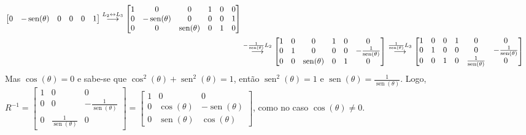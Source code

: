 \documentclass[12pt,a4paper]{article}
\newcommand*\sen{\operatorname{sen}}
\newcommand{\grstep}[2][\relax]{%
   \ensuremath{\mathrel{
       {\mathop{\longrightarrow}\limits^{#2\mathstrut}_{
                                     \begin{subarray}{l} #1 \end{subarray}}}}}}
\newcommand{\swap}{\leftrightarrow}
\begin{document}
\begin{enumerate}
\begin{align*}
\begin{bmatrix}
0 & -\sen(\theta) & 0 & 0 & 0 & 1
\end{bmatrix}
\grstep{ L_2 \swap L_3 }
\begin{bmatrix}
1 & 0 & 0 & 1 & 0 & 0 \\
0 & -\sen(\theta) & 0 & 0 & 0 & 1 \\
0 & 0 & \sen(\theta) & 0 & 1 & 0
\end{bmatrix}\\
&
\grstep{ -\frac{1}{\sen(\theta)} L_2 }
\begin{bmatrix}
1 & 0 & 0 & 1 & 0 & 0 \\
0 & 1 & 0 & 0 & 0 & -\frac{1}{\sen(\theta)} \\
0 & 0 & \sen(\theta) & 0 & 1 & 0
\end{bmatrix}
\grstep{ \frac{1}{\sen(\theta)} L_3 }
\begin{bmatrix}
1 & 0 & 0 & 1 & 0 & 0 \\
0 & 1 & 0 & 0 & 0 & -\frac{1}{\sen(\theta)} \\
0 & 0 & 1 & 0 & \frac{1}{\sen(\theta)} & 0
\end{bmatrix}
\end{align*}
Mas $\cos(\theta) = 0$ e sabe-se que $\cos^2(\theta) + \sen^2(\theta) = 1$, então $\sen^2(\theta) = 1$ e $\sen(\theta) = \frac{1}{\sen(\theta)}$. Logo, 
$
R^{-1}
=
\begin{bmatrix}
1 & 0 & 0 \\
0 & 0 & -\frac{1}{\sen(\theta)} \\
0 & \frac{1}{\sen(\theta)} & 0
\end{bmatrix}
=
\begin{bmatrix}
1 & 0 & 0 \\
0 & \cos(\theta) & -\sen(\theta) \\
0 & \sen(\theta) & \cos(\theta)
\end{bmatrix}$, como no caso $\cos(\theta) \neq 0$.



\end{enumerate}
\end{document}
